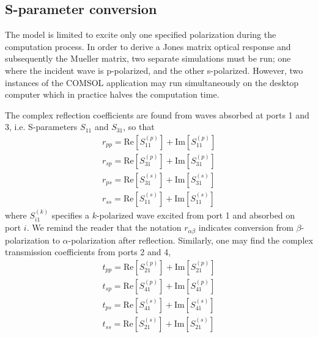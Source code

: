 
\subsection{S-parameter conversion}
 The model is limited to excite only one specified polarization during the computation process. In order to derive a Jones matrix optical response and subsequently the Mueller matrix, two separate simulations must be run; one where the incident wave is p-polarized, and the other s-polarized. However, two instances of the COMSOL application may run simultaneously on the desktop computer which in practice halves the computation time. 

The complex reflection coefficients are found from waves absorbed at ports 1 and 3, i.e. S-parameters $S_{11}$ and $S_{31}$, so that
\begin{subequations} 
\begin{align}
    r_{pp} = \text{Re}[S_{11}^{(p)}] + \text{Im}[S_{11}^{(p)}]  \\
    r_{sp} = \text{Re}[S_{31}^{(p)}] + \text{Im}[S_{31}^{(p)}]  \\
    r_{ps} = \text{Re}[S_{31}^{(s)}] + \text{Im}[S_{31}^{(s)}]  \\
    r_{ss} = \text{Re}[S_{11}^{(s)}] + \text{Im}[S_{11}^{(s)}]  
\end{align}
\end{subequations}
where $S_{i1}^{(k)}$ specifies a $k$-polarized wave excited from port 1 and absorbed on port $i$. We remind the reader that the notation $r_{\alpha\beta}$ indicates conversion from $\beta$-polarization to $\alpha$-polarization after reflection. Similarly, one may find the complex transmission coefficients from ports 2 and 4,
\begin{subequations} 
\begin{align}
    t_{pp} = \text{Re}[S_{21}^{(p)}] + \text{Im}[S_{21}^{(p)}]  \\
    t_{sp} = \text{Re}[S_{41}^{(p)}] + \text{Im}[S_{41}^{(p)}]  \\
    t_{ps} = \text{Re}[S_{41}^{(s)}] + \text{Im}[S_{41}^{(s)}]  \\
    t_{ss} = \text{Re}[S_{21}^{(s)}] + \text{Im}[S_{21}^{(s)}]  
\end{align}
\end{subequations}

